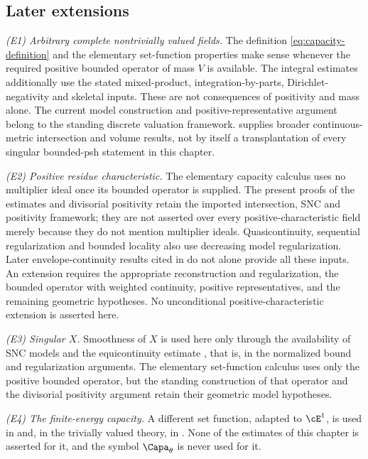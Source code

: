 \subsection{Later extensions}
\label{sec:ch25-later}

\emph{(E1) Arbitrary complete nontrivially valued fields.}
The definition \eqref{eq:capacity-definition} and the elementary
set-function properties make sense whenever the required positive bounded
operator of mass $V$ is available.  The integral estimates additionally
use the stated mixed-product, integration-by-parts, Dirichlet-negativity
and skeletal inputs.  These are not consequences of positivity and mass
alone.  The current model construction and positive-representative
argument belong to the standing discrete valuation framework.
\cite{BE21} supplies broader continuous-metric intersection and volume
results, not by itself a transplantation of every singular bounded-psh
statement in this chapter.

\emph{(E2) Positive residue characteristic.}
The elementary capacity calculus uses no multiplier ideal once its bounded
operator is supplied.  The present proofs of the estimates and divisorial
positivity retain the imported intersection, SNC and positivity framework;
they are not asserted over every positive-characteristic field merely
because they do not mention multiplier ideals.  Quasicontinuity,
sequential regularization and bounded locality also use decreasing model
regularization.  Later envelope-continuity results cited in
 do not alone provide all these inputs.
An extension requires the appropriate reconstruction and regularization,
the bounded operator with weighted continuity, positive representatives,
and the remaining geometric hypotheses.  No unconditional
positive-characteristic extension is asserted here.

\emph{(E3) Singular $X$.}  Smoothness of $X$ is used here only through
the availability of SNC models and the equicontinuity estimate
, that is, in the normalized bound and regularization arguments.  The elementary
set-function calculus uses only the positive bounded operator, but the
standing construction of that operator and the divisorial positivity
argument retain their geometric model hypotheses.

\emph{(E4) The finite-energy capacity.}  A different set function, adapted
to $\cE^1$, is used in  and, in the
trivially valued theory, in .  None of the
estimates of this chapter is asserted for it, and the symbol
$\Capa_\theta$ is never used for it.

